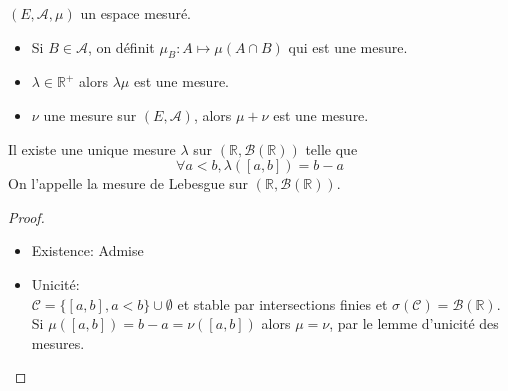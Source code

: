 \begin{prop}
	$(E, \mathscr{A}, \mu)$ un espace mesuré.
	\begin{itemize}
		\item Si $B \in \mathscr{A}$, on définit $\mu_B : A \mapsto \mu(A \cap B)$ qui est une mesure.
		\item $\lambda \in \mathbb{R}^+$ alors $\lambda \mu$ est une mesure.
		\item $\nu$ une mesure sur $(E, \mathscr{A})$, alors $\mu + \nu$ est une mesure.
	\end{itemize}
\end{prop}


\begin{theorem}
	Il existe une unique mesure $\lambda$ sur $(\mathbb{R}, \mathscr{B}(\mathbb{R}))$ telle que
	$$ \forall a < b, \lambda([a,b]) = b-a $$
	On l'appelle la mesure de Lebesgue sur $(\mathbb{R}, \mathscr{B}(\mathbb{R}))$.
\end{theorem}

\begin{proof}
	\begin{itemize}
		\item Existence: Admise
		\item Unicité: \\
		      $\mathscr{C} = \{ [a,b], a < b \} \cup \emptyset$ et stable par intersections finies et $\sigma (\mathscr{C}) = \mathscr{B}(\mathbb{R})$.
		      Si $\mu([a,b]) = b - a = \nu([a,b])$ alors $\mu = \nu$, par le lemme d'unicité des mesures.
	\end{itemize}
\end{proof}
